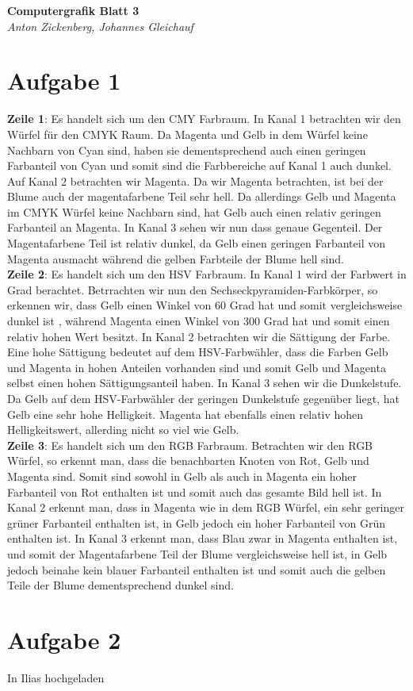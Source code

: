 \documentclass[12pt]{article}
\begin{document}
\begin{center}
 \textbf{\Large Computergrafik Blatt 3}\\
 \emph{Anton Zickenberg, Johannes Gleichauf}
\end{center}

\section*{Aufgabe 1}
\textbf{Zeile 1}: Es handelt sich um den CMY Farbraum. In Kanal 1 betrachten wir den Würfel für den CMYK Raum. Da Magenta und Gelb in dem Würfel keine Nachbarn von Cyan sind, haben sie dementsprechend auch einen geringen Farbanteil von Cyan und somit sind die Farbbereiche auf Kanal 1 auch dunkel. Auf Kanal 2 betrachten wir Magenta. Da wir Magenta betrachten, ist bei der Blume auch der magentafarbene Teil sehr hell. Da allerdings Gelb und Magenta im CMYK Würfel keine Nachbarn sind, hat Gelb auch einen relativ geringen Farbanteil an Magenta. In Kanal 3 sehen wir nun dass genaue Gegenteil. Der Magentafarbene Teil ist relativ dunkel, da Gelb einen geringen Farbanteil von Magenta ausmacht während die gelben Farbteile der Blume hell sind.\\
\textbf{Zeile 2}: Es handelt sich um den HSV Farbraum. In Kanal 1 wird der Farbwert in Grad berachtet. Betrrachten wir nun den Sechseckpyramiden-Farbkörper, so erkennen wir, dass Gelb einen Winkel von 60 Grad hat und somit vergleichsweise dunkel ist , während Magenta einen Winkel von 300 Grad hat und somit einen relativ hohen Wert besitzt. In Kanal 2 betrachten wir die Sättigung der Farbe. Eine hohe Sättigung bedeutet auf dem HSV-Farbwähler, dass die Farben Gelb und Magenta in hohen Anteilen vorhanden sind und somit Gelb und Magenta selbst einen hohen Sättigungsanteil haben. In Kanal 3 sehen wir die Dunkelstufe. Da Gelb auf dem HSV-Farbwähler der geringen Dunkelstufe gegenüber liegt, hat Gelb eine sehr hohe Helligkeit. Magenta hat ebenfalls einen relativ hohen Helligkeitswert, allerding nicht so viel wie Gelb.\\
\textbf{Zeile 3}: Es handelt sich um den RGB Farbraum.  Betrachten wir den RGB Würfel, so erkennt man, dass die benachbarten Knoten von Rot, Gelb und Magenta sind. Somit sind sowohl in Gelb als auch in Magenta ein hoher Farbanteil von Rot enthalten ist und somit auch das gesamte Bild hell ist. In Kanal 2 erkennt man, dass in Magenta wie in dem RGB Würfel, ein sehr geringer grüner Farbanteil enthalten ist, in Gelb jedoch ein hoher Farbanteil von Grün enthalten ist. In Kanal 3 erkennt man, dass Blau zwar in Magenta enthalten ist, und somit der Magentafarbene Teil der Blume vergleichsweise hell ist, in Gelb jedoch beinahe kein blauer Farbanteil enthalten ist und somit auch die gelben Teile der Blume dementsprechend dunkel sind.
\section*{Aufgabe 2}
In Ilias hochgeladen
\end{document}
